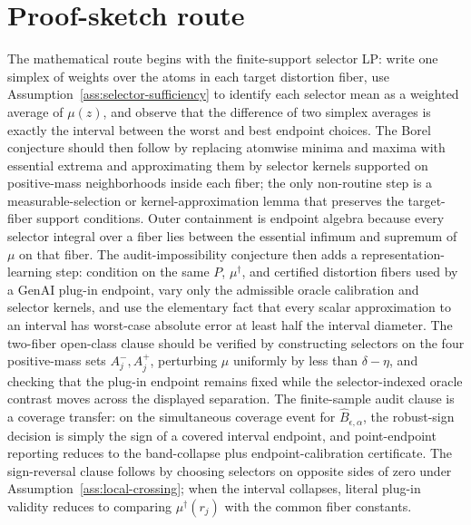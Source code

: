 \documentclass[11pt]{article}
\theoremstyle{definition}
\theoremstyle{plain}
\theoremstyle{remark}
\begin{document}
\section{Proof-sketch route}
The mathematical route begins with the finite-support selector LP: write one simplex of weights over the atoms in each target distortion fiber, use Assumption~\ref{ass:selector-sufficiency} to identify each selector mean as a weighted average of \(\mu(z)\), and observe that the difference of two simplex averages is exactly the interval between the worst and best endpoint choices.  The Borel conjecture should then follow by replacing atomwise minima and maxima with essential extrema and approximating them by selector kernels supported on positive-mass neighborhoods inside each fiber; the only non-routine step is a measurable-selection or kernel-approximation lemma that preserves the target-fiber support conditions.  Outer containment is endpoint algebra because every selector integral over a fiber lies between the essential infimum and supremum of \(\mu\) on that fiber.  The audit-impossibility conjecture then adds a representation-learning step: condition on the same \(P\), \(\mu^\dagger\), and certified distortion fibers used by a GenAI plug-in endpoint, vary only the admissible oracle calibration and selector kernels, and use the elementary fact that every scalar approximation to an interval has worst-case absolute error at least half the interval diameter.  The two-fiber open-class clause should be verified by constructing selectors on the four positive-mass sets \(A_j^-,A_j^+\), perturbing \(\mu\) uniformly by less than \(\delta-\eta\), and checking that the plug-in endpoint remains fixed while the selector-indexed oracle contrast moves across the displayed separation.  The finite-sample audit clause is a coverage transfer: on the simultaneous coverage event for \(\widehat B_{\epsilon,\alpha}\), the robust-sign decision is simply the sign of a covered interval endpoint, and point-endpoint reporting reduces to the band-collapse plus endpoint-calibration certificate.  The sign-reversal clause follows by choosing selectors on opposite sides of zero under Assumption~\ref{ass:local-crossing}; when the interval collapses, literal plug-in validity reduces to comparing \(\mu^\dagger(r_j)\) with the common fiber constants.
\end{document}
